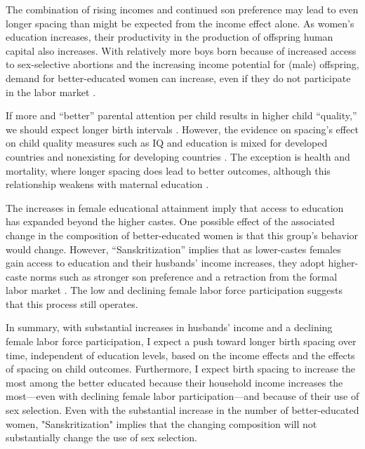\documentclass[12pt,letterpaper]{article}
\begin{document}
The combination of rising incomes and continued son preference may lead to even longer 
spacing than might be expected from the income effect alone.
As women's education increases, their productivity in the production of offspring human 
capital also increases.
With relatively more boys born because of increased access to sex-selective 
abortions and the increasing income potential for (male) offspring, demand for 
better-educated women can increase, even if they do not participate in the labor market 
\citep{Behrman1999}.

If more and ``better'' parental attention per child results in higher child ``quality,'' 
we should expect longer birth intervals \citep{Zajonc1975,Zajonc1976,Razin1980}.
However, the evidence on spacing's effect on child quality measures such as IQ 
and education is mixed for developed countries and nonexisting for developing countries
\citep{Powell1993,Pettersson-Lidbom2009,Buckles2012,Barclay2017}.
The exception is health and mortality, where longer spacing does lead to better outcomes, 
although this relationship weakens with maternal education 
\citep{Whitworth2002,Conde-Agudelo2012,Molitoris2019}.



The increases in female educational attainment imply that access to education has 
expanded beyond the higher castes. 
One possible effect of the associated change in the composition of better-educated women 
is that this group's behavior would change.
However, ``Sanskritization'' implies that as lower-castes females gain access to 
education and their husbands' income increases, they adopt higher-caste 
norms such as stronger son preference and a retraction from the formal labor 
market \citep{Srinivas1956,Chen1995,Abraham2013,Chatterjee2018}.
The low and declining female labor force participation suggests that this process still operates.


In summary, with substantial increases in husbands' income and a declining female labor 
force participation, I expect a push toward longer birth spacing over time, independent
of education levels, based on the income effects and the effects of spacing
on child outcomes.
Furthermore, I expect birth spacing to increase the most among the better educated 
because their household income increases the most---even with declining female labor 
participation---and because of their use of sex selection.
Even with the substantial increase in the number of better-educated women, 
"Sanskritization" implies that the changing composition will not substantially change 
the use of sex selection.
\end{document}
